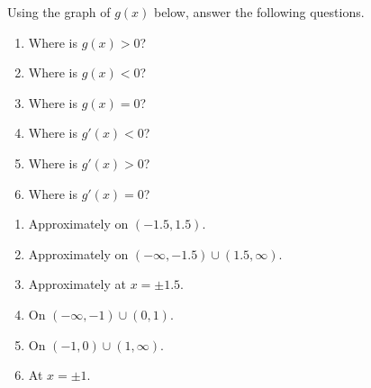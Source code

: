 {Using the graph of $g(x)$ below, answer the following questions.
\begin{enumerate}
\item		Where is $g(x) > 0$?
\item		Where is $g(x) < 0$?
\item		Where is $g(x) = 0$?
\item		Where is $g'(x) < 0$?
\item		Where is $g'(x) > 0$?
\item		Where is $g'(x) = 0$?
\end{enumerate}

}
{	\begin{enumerate}
\item		Approximately on $(-1.5,1.5)$.
\item		Approximately on $(-\infty,-1.5) \cup (1.5,\infty)$.
\item		Approximately at $x=\pm 1.5$.
\item		On $(-\infty,-1) \cup (0,1)$.
\item		On $(-1,0) \cup (1,\infty)$.
\item		At $x=\pm 1$.
\end{enumerate}
}
